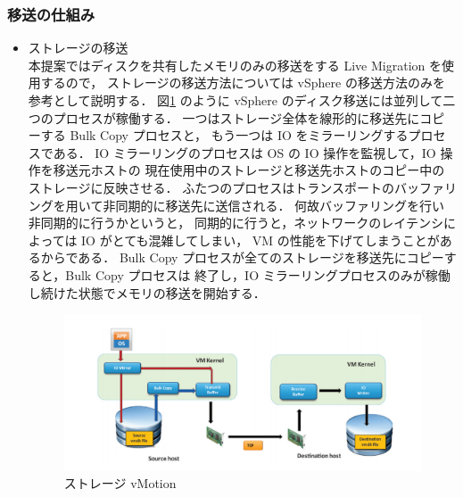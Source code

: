\documentclass[graduation-thesis]{mlarticle}
\begin{document}
\subsubsection{移送の仕組み}
\label{sec-2-3-4}
\begin{itemize}
\item ストレージの移送\\
      本提案ではディスクを共有したメモリのみの移送をする Live Migration を使用するので，
ストレージの移送方法については vSphere の移送方法のみを参考として説明する．
図\ref{vmotion} \cite{Sreekanth:2012:VV5} のように
vSphere のディスク移送には並列して二つのプロセスが稼働する．
一つはストレージ全体を線形的に移送先にコピーする Bulk Copy プロセスと，
もう一つは IO をミラーリングするプロセスである．
IO ミラーリングのプロセスは OS の IO 操作を監視して，IO 操作を移送元ホストの
現在使用中のストレージと移送先ホストのコピー中のストレージに反映させる．
ふたつのプロセスはトランスポートのバッファリングを用いて非同期的に移送先に送信される．
何故バッファリングを行い非同期的に行うかというと，
同期的に行うと，ネットワークのレイテンシによっては IO がとても混雑してしまい，
VM の性能を下げてしまうことがあるからである．
Bulk Copy プロセスが全てのストレージを移送先にコピーすると，Bulk Copy プロセスは
終了し，IO ミラーリングプロセスのみが稼働し続けた状態でメモリの移送を開始する．
\begin{figure}[H]\begin{center}\includegraphics[width=12.0cm]{./img/vmotion.png}\caption{ ストレージ vMotion}\label{vmotion}\end{center}\end{figure}


\end{itemize}
\end{document}
